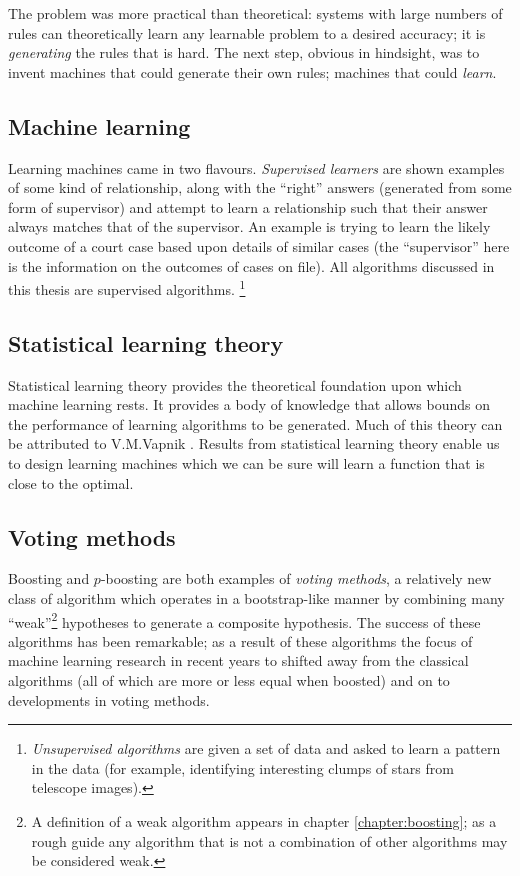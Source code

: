 The problem was more practical than theoretical: systems with large
numbers of rules can theoretically learn any learnable problem to a
desired accuracy; it is \emph{generating} the rules that is hard.  The
next step, obvious in hindsight, was to invent machines that could
generate their own rules; machines that could \emph{learn}.


\subsection{Machine learning}

Learning machines came in two flavours.  \emph{Supervised learners} are
shown examples of some kind of relationship, along with the ``right''
answers (generated from some form of supervisor) and attempt to learn a
relationship such that their answer always matches that of the
supervisor.  An example is trying to learn the likely outcome of a
court case based upon details of similar cases (the ``supervisor''
here is the information on the outcomes of cases on file).  All
algorithms discussed in this thesis are supervised algorithms.
\footnote{\emph{Unsupervised algorithms} are given a set of data and
asked to learn a pattern in the data (for example, identifying
interesting clumps of stars from telescope images).}


\subsection{Statistical learning theory}

Statistical learning theory provides the theoretical foundation upon
which machine learning rests.  It provides a body of knowledge that
allows bounds on the performance of learning algorithms to be
generated.  Much of this theory can be attributed to V.M.Vapnik
\cite{Vapnik95}.  Results from statistical learning theory enable us
to design learning machines which we can be sure will learn a function
that is close to the optimal.

\subsection{Voting methods}

Boosting and $p$-boosting are both examples of \emph{voting methods},
a relatively new class of algorithm which operates in a bootstrap-like
manner by combining many ``weak''\footnote{A definition of a weak
algorithm appears in chapter \ref{chapter:boosting}; as a rough guide any
algorithm that is not a combination of other algorithms may be
considered weak.} hypotheses to generate a composite hypothesis.  The
success of these algorithms has been remarkable; as a result of these
algorithms the focus of machine learning research in recent years to
shifted away from the classical algorithms (all of which are more or
less equal when boosted) and on to developments in voting methods.

